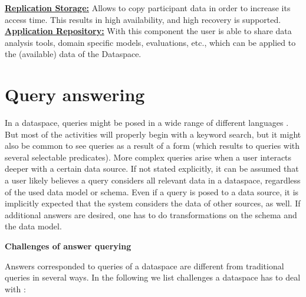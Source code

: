 \uline{\textbf{Replication Storage:}} Allows to copy participant data in order to increase its access time. This results in high availability, and high recovery is supported.\\

\uline{\textbf{Application Repository:}} With this component the user is able to share data analysis tools, domain specific models, evaluations, etc., which can be applied to the (available) data of the Dataspace.\\


\section{Query answering}

In a dataspace, queries might be posed in a wide range of different languages \cite[p. 3]{Halevy:2006:PDS:1142351.1142352}. But most of the activities will properly begin with a keyword search, but it might also be common to see queries as a result of a form (which results to queries with several selectable predicates). More complex queries arise when a user interacts deeper with a certain data source. 
If not stated explicitly, it can be assumed that a user likely believes a query considers all relevant data in a dataspace, regardless of the used data model or schema. Even if a query is posed to a data source, it is implicitly expected that the system considers the data of other sources, as well. If additional answers are desired, one has to do transformations on the schema and the data model.

\textbf{Challenges of answer querying}

Answers corresponded to queries of a dataspace are different from traditional queries in several ways. In the following we list challenges a dataspace has to deal with \cite[p. 3-4]{Halevy:2006:PDS:1142351.1142352}:

